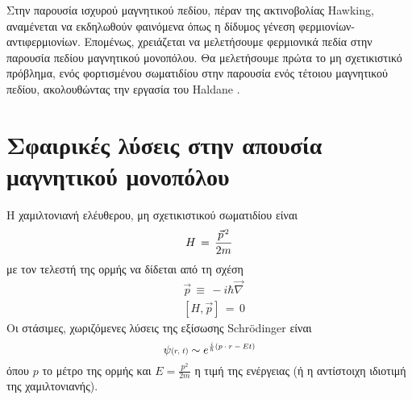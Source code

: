 Στην παρουσία ισχυρού μαγνητικού πεδίου, πέραν της ακτινοβολίας Hawking, αναμένεται να εκδηλωθούν φαινόμενα όπως η δίδυμος γένεση φερμιονίων-αντιφερμιονίων. Επομένως, χρειάζεται να μελετήσουμε φερμιονικά πεδία στην παρουσία πεδίου μαγνητικού μονοπόλου. Θα μελετήσουμε πρώτα το μη σχετικιστικό πρόβλημα, ενός φορτισμένου σωματιδίου στην παρουσία ενός τέτοιου μαγνητικού πεδίου, ακολουθώντας την εργασία του Haldane \cite{PhysRevLett.51.605}. 

\section{Σφαιρικές λύσεις στην απουσία μαγνητικού μονοπόλου}
Η χαμιλτονιανή ελέυθερου, μη σχετικιστικού σωματιδίου είναι 
\begin{equation}
    H \,=\, \frac{\Vec{p}\superscr{\,2}}{2m}
\end{equation}
με τον τελεστή της ορμής να δίδεται από τη σχέση 
\begin{equation*}
\begin{split}
    &\Vec{p}\,\equiv\,-i\hbar\vec{\nabla}\\
    &\left[ H, \Vec{p} \right]\,=\,0
\end{split}
\end{equation*}
Οι στάσιμες, χωριζόμενες λύσεις της εξίσωσης Schrödinger είναι 
\begin{equation}
    \psi\text{\scalebox{0.7}{($r,\,t$)}}\sim e\superscr{\frac{i}{\hbar}(p\cdot r - Et)}
\end{equation}
όπου $p$ το μέτρο της ορμής και $E=\frac{p^2}{2m}$ η τιμή της ενέργειας (ή η αντίστοιχη ιδιοτιμή της χαμιλτονιανής).\\

